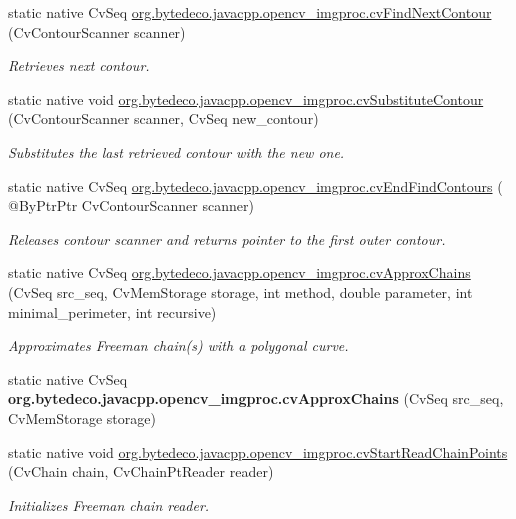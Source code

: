 \begin{DoxyCompactItemize}
static native Cv\+Seq \hyperlink{group__imgproc__c_gab3ea632f49f741ef73888cd1ab8f9556}{org.\+bytedeco.\+javacpp.\+opencv\+\_\+imgproc.\+cv\+Find\+Next\+Contour} (Cv\+Contour\+Scanner scanner)
\begin{DoxyCompactList}\small\item\em Retrieves next contour. \end{DoxyCompactList}\item 
static native void \hyperlink{group__imgproc__c_ga9d72a578b9f29589e8b85b100cd25e01}{org.\+bytedeco.\+javacpp.\+opencv\+\_\+imgproc.\+cv\+Substitute\+Contour} (Cv\+Contour\+Scanner scanner, Cv\+Seq new\+\_\+contour)
\begin{DoxyCompactList}\small\item\em Substitutes the last retrieved contour with the new one. \end{DoxyCompactList}\item 
static native Cv\+Seq \hyperlink{group__imgproc__c_ga79913a8abbec2491176f92da28a62346}{org.\+bytedeco.\+javacpp.\+opencv\+\_\+imgproc.\+cv\+End\+Find\+Contours} ( @By\+Ptr\+Ptr Cv\+Contour\+Scanner scanner)
\begin{DoxyCompactList}\small\item\em Releases contour scanner and returns pointer to the first outer contour. \end{DoxyCompactList}\item 
static native Cv\+Seq \hyperlink{group__imgproc__c_ga5c874856009b84fc0c3a9533f957516c}{org.\+bytedeco.\+javacpp.\+opencv\+\_\+imgproc.\+cv\+Approx\+Chains} (Cv\+Seq src\+\_\+seq, Cv\+Mem\+Storage storage, int method, double parameter, int minimal\+\_\+perimeter, int recursive)
\begin{DoxyCompactList}\small\item\em Approximates Freeman chain(s) with a polygonal curve. \end{DoxyCompactList}\item 
\mbox{\label{group__imgproc__c_ga5d1f8ced5917a3e4ee4892565c81e7b7}} 
static native Cv\+Seq {\bfseries org.\+bytedeco.\+javacpp.\+opencv\+\_\+imgproc.\+cv\+Approx\+Chains} (Cv\+Seq src\+\_\+seq, Cv\+Mem\+Storage storage)
\item 
static native void \hyperlink{group__imgproc__c_gab6502128f5100580662a79a7326e50e0}{org.\+bytedeco.\+javacpp.\+opencv\+\_\+imgproc.\+cv\+Start\+Read\+Chain\+Points} (Cv\+Chain chain, Cv\+Chain\+Pt\+Reader reader)
\begin{DoxyCompactList}\small\item\em Initializes Freeman chain reader. \end{DoxyCompactList}\item 

\end{DoxyCompactItemize}
